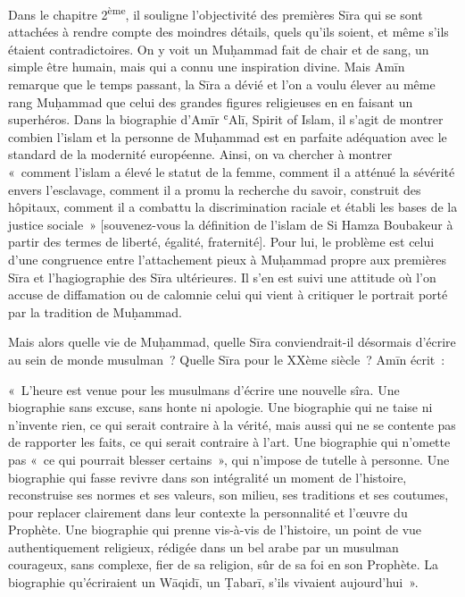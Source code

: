 Dans le chapitre
2\textsuperscript{ème}, il souligne l'objectivité des premières Sīra qui
se sont attachées à rendre compte des moindres détails, quels qu'ils
soient, et même s'ils étaient contradictoires. On y voit un Muḥammad
fait de chair et de sang, un simple être humain, mais qui a connu une
inspiration divine. Mais Amīn remarque que le temps passant, la Sīra a
dévié et l'on a voulu élever au même rang Muḥammad que celui des grandes
figures religieuses en en faisant un superhéros. Dans la biographie
d'Amīr ʿAlī, {Spirit of Islam}, il s'agit de montrer combien
l'islam et la personne de Muḥammad est en parfaite adéquation avec le
standard de la modernité européenne. Ainsi, on va chercher à montrer
{«~comment l'islam a élevé le statut de la femme, comment il a
atténué la sévérité envers l'esclavage, comment il a promu la recherche
du savoir, construit des hôpitaux, comment il a combattu la
discrimination raciale et établi les bases de la justice sociale~}»
{[}souvenez-vous la définition de l'islam de Si Hamza Boubakeur à partir
des termes de liberté, égalité, fraternité{]}. Pour lui, le problème est
celui d'une congruence entre l'attachement pieux à Muḥammad propre aux
premières Sīra et l'hagiographie des Sīra ultérieures. Il s'en est suivi
une attitude où l'on accuse de diffamation ou de calomnie celui qui
vient à critiquer le portrait porté par la tradition de Muḥammad.

Mais alors quelle vie de Muḥammad, quelle Sīra conviendrait-il désormais
d'écrire au sein de monde musulman~? Quelle Sīra pour le XXème siècle~?
Amīn écrit~:

«~L'heure est venue pour les musulmans d'écrire une nouvelle sîra. Une
biographie sans excuse, sans honte ni apologie. Une biographie qui ne
taise ni n'invente rien, ce qui serait contraire à la vérité, mais aussi
qui ne se contente pas de rapporter les faits, ce qui serait contraire à
l'art. Une biographie qui n'omette pas «~ce qui pourrait blesser
certains~», qui n'impose de tutelle à personne. Une biographie qui fasse
revivre dans son intégralité un moment de l'histoire, reconstruise ses
normes et ses valeurs, son milieu, ses traditions et ses coutumes, pour
replacer clairement dans leur contexte la personnalité et l'œuvre du
Prophète. Une biographie qui prenne vis-à-vis de l'histoire, un point de
vue authentiquement religieux, rédigée dans un bel arabe par un musulman
courageux, sans complexe, fier de sa religion, sûr de sa foi en son
Prophète. La biographie qu'écriraient un Wāqidī, un Ṭabarī, s'ils
vivaient aujourd'hui~».


